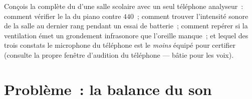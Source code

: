 \begin{exercise}[$\star\star\star$]\label{exo:g8:sound-pitch-loudness:12}
Conçois la  complète du  d'une salle scolaire avec un seul
téléphone analyseur~: comment vérifier le la du piano contre $440$~;
comment trouver l'intensité sonore de la salle au dernier rang
pendant un essai de batterie~; comment repérer si la ventilation émet
un grondement infrasonore que l'oreille manque~; et lequel des trois
constats le microphone du téléphone est le \emph{moins} équipé pour
certifier (consulte la propre fenêtre d'audition du téléphone ---
bâtie pour les voix).
\end{exercise}

\section{Problème~: la balance du son}

